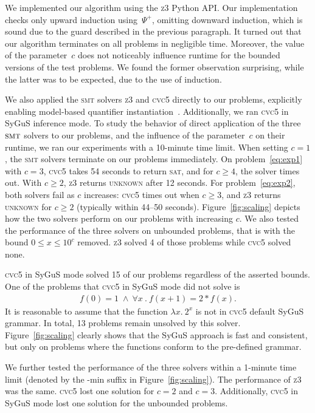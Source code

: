 \documentclass[runningheads]{llncs}
\newcommand{\sygus}{SyGuS\xspace}
\newcommand{\smt}{\textsc{smt}}
\begin{document}
We implemented our algorithm using the \textsc{z3} Python API. Our implementation checks only upward induction using~$\Psi^+$, omitting downward induction, which is sound due to the guard described in the previous paragraph. It turned out that our algorithm terminates on all problems in negligible time.
Moreover, the value of the parameter~$c$ does not noticeably influence runtime
for the bounded versions of the test problems. We found the former observation surprising,
while the latter was to be expected, due to the use of induction.

We also applied the \textsc{smt} solvers \textsc{z3} and \textsc{cvc5}
directly to our problems, explicitly enabling model-based quantifier instantiation~\cite{ge-cav09}.
Additionally, we ran \textsc{cvc5} in \sygus inference mode.
To study the behavior of direct application of the three $\smt$ solvers to our problems, and the influence
of the parameter~$c$ on their runtime, we ran our experiments with a 10-minute time limit.
When setting $c = 1$, the \textsc{smt} solvers terminate on our
problems immediately. On problem~\eqref{eq:exp1} with $c = 3$, \textsc{cvc5} takes
54 seconds to return \textsc{sat}, and for $c \geq 4$, the solver times out.
With $c \geq 2$, \textsc{z3} returns \textsc{unknown} after 12 seconds. For problem~\eqref{eq:exp2},
both solvers fail as $c$ increases: \textsc{cvc5} times out when $c \geq 3$,
and \textsc{z3} returns \textsc{unknown} for $c \geq 2$ (typically within 44–50 seconds).
Figure~\ref{fig:scaling} depicts how the two solvers perform on our problems with increasing $c$.
We also tested the performance of the three solvers on unbounded problems, that is with the
bound $0 \le x \le 10^c$ removed. \textsc{z3} solved 4 of those problems while \textsc{cvc5}
solved none.

\textsc{cvc5} in \sygus mode solved 15 of our problems regardless
of the asserted bounds.
One of the problems that \textsc{cvc5} in \sygus mode did not solve is
\begin{align*}
	f(0) = 1 \;\land \:\forall x \:. \:f(x+1) = 2*f(x).
\end{align*}
It is reasonable to assume that the function $\lambda x. \:2^{x}$ is not in \textsc{cvc5}
default \sygus grammar. In total, 13 problems remain unsolved by this solver.
Figure~\ref{fig:scaling} clearly shows
that the \sygus approach is fast and consistent, but only on problems where
the functions conform to the pre-defined grammar.

We further tested the performance of the three solvers within a 1-minute time limit
(denoted by the -min suffix in Figure~\ref{fig:scaling}).
The performance of \textsc{z3} was the same. \textsc{cvc5} lost one solution for
$c = 2$ and $c = 3$. Additionally, \textsc{cvc5} in \sygus mode lost one
solution for the unbounded problems.
\end{document}
